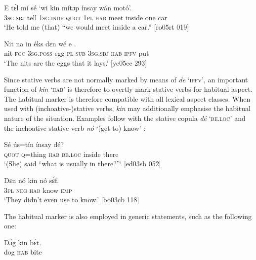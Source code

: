 \ea%
    \label{ex:key:342}
    \gll E    tɛ́l  mí    sé    ‘wi  kin  mítɔp  ínsay  wán  motó’.\\
\textsc{3sg.sbj}  tell  \textsc{1sg.indp}  \textsc{quot}    \textsc{1pl}  \textsc{hab}  meet  inside  one  car\\


\glt ‘He told me (that) “we would meet inside a car.”   [ro05rt 019]
\z

\ea%
    \label{ex:key:343}
    \gll Nit  na  in    éks  dɛn  wé  e      .\\
nit  \textsc{foc}  \textsc{3sg.poss}  egg  \textsc{pl}  \textsc{sub}  \textsc{3sg.sbj}  \textsc{hab}  \textsc{ipfv}  put\\

\glt ‘The nits are the eggs that it lays.’ [ye05ce 293]
\z

Since stative verbs are not normally marked by means of \textit{de} ‘\textsc{ipfv’}, an important function of \textit{kin} ‘\textsc{hab’} is therefore to overtly mark stative verbs for habitual aspect. The habitual marker is therefore compatible with all lexical aspect classes. When used with (inchoative-)stative verbs, \textit{kin} may additionally emphasise the habitual nature of the situation. Examples follow with the stative copula \textit{dé} \textsc{‘be.loc’}  and the inchoative-stative verb \textit{nó} ‘(get to) know’ :


\ea%
    \label{ex:key:344}
    \gll Sé    ús=tín       ínsay  dé?\\
\textsc{quot}    \textsc{q}=thing  \textsc{hab}  \textsc{be.loc}  inside  there\\

\glt ‘(She) said “what is usually in there?”‘ [ed03sb 052]
\z


\ea%
    \label{ex:key:345}
    \gll Dɛn    nó  kin  nó    sɛ́f.\\
\textsc{3pl}    \textsc{neg}  \textsc{hab}  know  \textsc{emp}\\

\glt ‘They didn’t even use to know.’ [bo03cb 118]
\z

The habitual marker is also employed in generic statements, such as the following one:


\ea%
    \label{ex:key:346}
    \gll Dɔ́g    kin  bɛ́t.\\
dog    \textsc{hab}  bite\\

